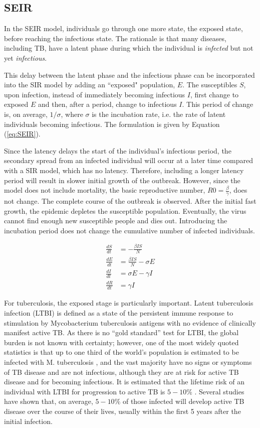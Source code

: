 \documentclass[8pt,twocolumn]{extarticle}
\begin{document}
\subsection{SEIR}
In the SEIR model, individuals go through one more state, the exposed state, before reaching the infectious state. The rationale is that many diseases, including TB, have a latent phase during which the individual is \textit{infected} but not yet \textit{infectious}.

This delay between the latent phase and the infectious phase can be incorporated into the SIR model by adding an ``exposed" population, $E$. The susceptibles $S$, upon infection, instead of immediately becoming infectious $I$, first change to exposed $E$ and then, after a period, change to infectious $I$. This period of change is, on average, $1/\sigma$, where $\sigma$ is the incubation rate, i.e. the rate of latent individuals becoming infectious. The formulation is given by Equation (\ref{eq:SEIR}).

Since the latency delays the start of the individual’s infectious period, the secondary spread from an infected individual will occur at a later time compared with a SIR model, which has no latency. Therefore, including a longer latency period will result in slower initial growth of the outbreak. However, since the model does not include mortality, the basic reproductive number, $R0 = \frac{\beta}{\gamma}$, does not change. The complete course of the outbreak is observed. After the initial fast growth, the epidemic depletes the susceptible population. Eventually, the virus cannot find enough new susceptible people and dies out. Introducing the incubation period does not change the cumulative number of infected individuals.

\begin{align}
\frac{dS}{dt} &= -\frac{\beta IS}{N} \nonumber\\
\frac{dE}{dt} &= \frac{\beta IS}{N}- \sigma E \nonumber\\
\frac{dI}{dt} &= \sigma E- \gamma I \nonumber\\
\frac{dR}{dt} &= \gamma I \label{eq:SEIR}
\end{align}

For tuberculosis, the exposed stage is particularly important. Latent tuberculosis infection (LTBI) is defined as a state of the persistent immune response to stimulation by Mycobacterium tuberculosis antigens with no evidence of clinically manifest active TB. As there is no ``gold standard” test for LTBI, the global burden is not known with certainty; however, one of the most widely quoted statistics is that up to one third of the world’s population is estimated to be infected with M. tuberculosis \cite{Eimportance1}\cite{Eimportance2}, and the vast majority have no signs or symptoms of TB disease and are not infectious, although they are at risk for active TB disease and for becoming infectious. It is estimated that the lifetime risk of an individual with LTBI for progression to active TB is $5-10\%$ \cite{Eimportance3}. Several studies have shown that, on average, $5-10\%$ of those infected will develop active TB disease over the course of their lives, usually within the first 5 years after the initial infection.
\end{document}
